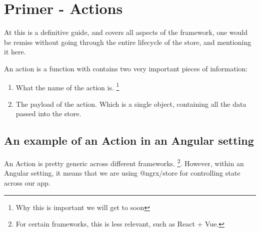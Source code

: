 \maketitle{}
\section{ Primer - Actions }
At this is a definitive guide, and covers all aspects of the framework, one
would be remiss without going through the entire lifecycle of the store, and
mentioning it here.

An action is a function with contains two very important pieces of information:
\begin{enumerate}
  \item What the name of the action is. \footnote{Why this is important we will
  get to soon}
  \item The payload of the action. Which is a single object, containing all the
  data passed into the store.
\end{enumerate}

\subsection{An example of an Action in an Angular setting}
An Action is pretty generic across different frameworks. \footnote{For certain
frameworks, this is less relevant, such as React + Vue.}. However, within an
Angular setting, it means that we are using @ngrx/store for controlling state
across our app.
